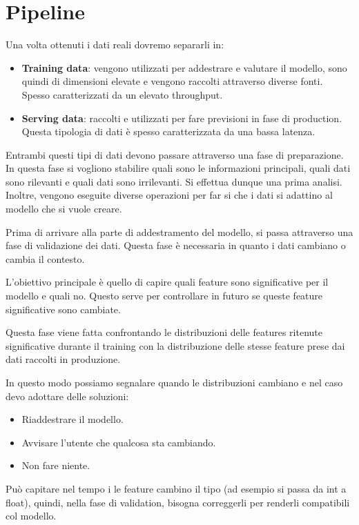 \section{Pipeline}
Una volta ottenuti i dati reali dovremo separarli in:
\begin{itemize}
      \item \textbf{Training data}: vengono utilizzati per addestrare e valutare
            il modello, sono quindi di dimensioni elevate e vengono raccolti
            attraverso diverse fonti. Spesso caratterizzati da un elevato throughput.
      \item \textbf{Serving data}: raccolti e utilizzati per fare previsioni in
            fase di production. Questa tipologia di dati è spesso caratterizzata
            da una bassa latenza.
\end{itemize}
Entrambi questi tipi di dati devono passare attraverso una fase di preparazione.
In questa fase si vogliono stabilire quali sono le informazioni principali,
quali dati sono rilevanti e quali dati sono irrilevanti. Si effettua dunque una
prima analisi. Inoltre, vengono eseguite diverse operazioni per far si che i dati
si adattino al modello che si vuole creare.

Prima di arrivare alla parte di addestramento del modello, si passa attraverso una
fase di validazione dei dati. Questa fase è necessaria in quanto i dati cambiano
o cambia il contesto.

L'obiettivo principale è quello di capire quali feature sono significative
per il modello e quali no. Questo serve per controllare in futuro se queste
feature significative sono cambiate.

Questa fase viene fatta confrontando le distribuzioni delle features ritenute
significative durante il training con la distribuzione delle stesse feature prese
dai dati raccolti in produzione.

In questo modo possiamo segnalare quando le distribuzioni cambiano e nel caso devo
adottare delle soluzioni:
\begin{itemize}
      \item Riaddestrare il modello.
      \item Avvisare l'utente che qualcosa sta cambiando.
      \item Non fare niente.
\end{itemize}
Può capitare nel tempo i le feature cambino il tipo (ad esempio si passa da int
a float), quindi, nella fase di validation, bisogna correggerli per renderli
compatibili col modello.

